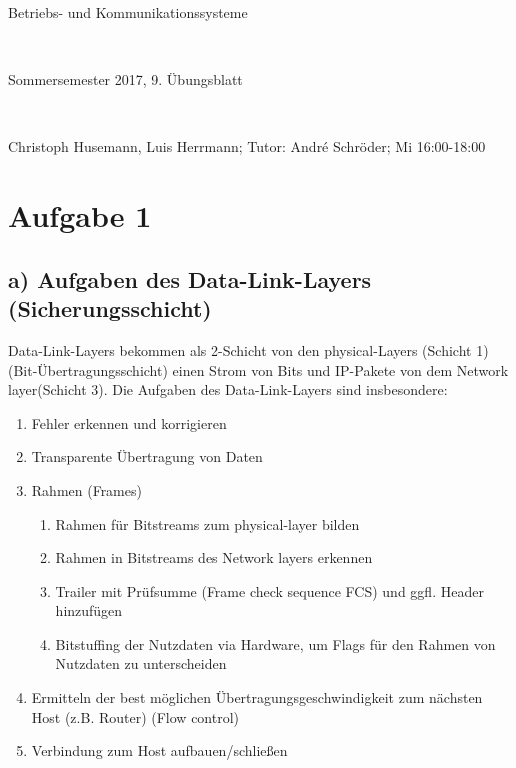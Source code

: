 \documentclass[numbers=noendperiod]{scrartcl}
\begin{document}
	
	\setlength{\parindent}{0em} 
	
	\newcommand{\inputmintedframed}[2]{
		\begin{mdframed}[linecolor=bg,backgroundcolor=bg]
			\inputminted[mathescape,breaklines,linenos,numbersep=5pt,tabsize=3]{#1}{#2}
	\end{mdframed}}
	
	\hrulefill
	\begin{center}
		\bfseries %
		\sffamily %
		\begin{huge}
			Betriebs- und Kommunikationssysteme
		\end{huge}\\
		\begin{Large}
			Sommersemester 2017, 9. Übungsblatt
		\end{Large}\\
		\begin{small}
			Christoph Husemann, Luis Herrmann; Tutor: André Schröder; Mi 16:00-18:00
		\end{small}
		
		\vspace{-10pt}
	\end{center}
	\hrulefill
	
\section*{Aufgabe 1}
\subsection*{a) Aufgaben des Data-Link-Layers (Sicherungsschicht)}
Data-Link-Layers bekommen als 2-Schicht von den physical-Layers (Schicht 1) (Bit-Übertragungsschicht) einen Strom von Bits und IP-Pakete von dem Network layer(Schicht 3). Die Aufgaben des Data-Link-Layers sind insbesondere:
\begin{enumerate}
	\item Fehler erkennen und korrigieren
	\item Transparente Übertragung von Daten
	\item Rahmen (Frames)
	\begin{enumerate}
		\item Rahmen für Bitstreams zum physical-layer bilden
		\item Rahmen in Bitstreams des Network layers erkennen 
		\item Trailer mit Prüfsumme (Frame check sequence FCS) und ggfl. Header hinzufügen
		\item Bitstuffing der Nutzdaten via Hardware, um Flags für den Rahmen von Nutzdaten zu unterscheiden
	\end{enumerate}
	\item Ermitteln der best möglichen Übertragungsgeschwindigkeit zum nächsten Host (z.B. Router) (Flow control)
	\item Verbindung zum Host aufbauen/schließen
	
\end{enumerate}
\end{document}
